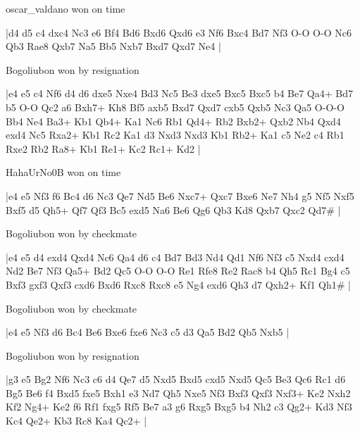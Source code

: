 \showboard

oscar\_valdano won on time

\makegametitle
|d4 d5 c4 dxc4 Nc3 e6 Bf4 Bd6 Bxd6 Qxd6 e3 Nf6 Bxc4 Bd7 Nf3 O-O O-O Nc6 Qb3 Rae8 Qxb7 Na5 Bb5 Nxb7 Bxd7 Qxd7 Ne4  |

\showboard

Bogoliubon won by resignation

\makegametitle
|e4 e5 c4 Nf6 d4 d6 dxe5 Nxe4 Bd3 Nc5 Be3 dxe5 Bxc5 Bxc5 b4 Be7 Qa4+ Bd7 b5 O-O Qc2 a6 Bxh7+ Kh8 Bf5 axb5 Bxd7 Qxd7 cxb5 Qxb5 Nc3 Qa5 O-O-O Bb4 Ne4 Ba3+ Kb1 Qb4+ Ka1 Nc6 Rb1 Qd4+ Rb2 Bxb2+ Qxb2 Nb4 Qxd4 exd4 Nc5 Rxa2+ Kb1 Rc2 Ka1 d3 Nxd3 Nxd3 Kb1 Rb2+ Ka1 c5 Ne2 c4 Rb1 Rxe2 Rb2 Ra8+ Kb1 Re1+ Kc2 Rc1+ Kd2  |

\showboard

HahaUrNo0B won on time

\makegametitle
|e4 e5 Nf3 f6 Bc4 d6 Nc3 Qe7 Nd5 Be6 Nxc7+ Qxc7 Bxe6 Ne7 Nh4 g5 Nf5 Nxf5 Bxf5 d5 Qh5+ Qf7 Qf3 Bc5 exd5 Na6 Be6 Qg6 Qb3 Kd8 Qxb7 Qxc2 Qd7\#  |

\showboard

Bogoliubon won by checkmate

\makegametitle
|e4 e5 d4 exd4 Qxd4 Nc6 Qa4 d6 c4 Bd7 Bd3 Nd4 Qd1 Nf6 Nf3 c5 Nxd4 cxd4 Nd2 Be7 Nf3 Qa5+ Bd2 Qc5 O-O O-O Re1 Rfe8 Re2 Rac8 b4 Qh5 Rc1 Bg4 c5 Bxf3 gxf3 Qxf3 cxd6 Bxd6 Rxc8 Rxc8 e5 Ng4 exd6 Qh3 d7 Qxh2+ Kf1 Qh1\#  |

\showboard

Bogoliubon won by checkmate

\makegametitle
|e4 e5 Nf3 d6 Bc4 Be6 Bxe6 fxe6 Nc3 c5 d3 Qa5 Bd2 Qb5 Nxb5  |

\showboard

Bogoliubon won by resignation

\makegametitle
|g3 e5 Bg2 Nf6 Nc3 c6 d4 Qe7 d5 Nxd5 Bxd5 cxd5 Nxd5 Qc5 Be3 Qc6 Rc1 d6 Bg5 Be6 f4 Bxd5 fxe5 Bxh1 e3 Nd7 Qh5 Nxe5 Nf3 Bxf3 Qxf3 Nxf3+ Ke2 Nxh2 Kf2 Ng4+ Ke2 f6 Rf1 fxg5 Rf5 Be7 a3 g6 Rxg5 Bxg5 b4 Nh2 c3 Qg2+ Kd3 Nf3 Kc4 Qe2+ Kb3 Rc8 Ka4 Qc2+  |

